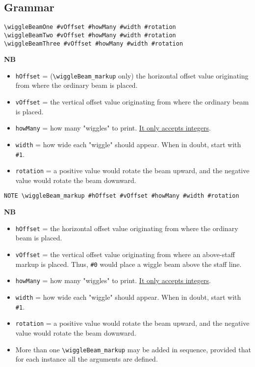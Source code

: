 \documentclass[11pt, oneside]{book}   	%
\begin{document}
\subsection{Grammar}
\begin{verbatim}
\wiggleBeamOne #vOffset #howMany #width #rotation 
\wiggleBeamTwo #vOffset #howMany #width #rotation 
\wiggleBeamThree #vOffset #howMany #width #rotation 
\end{verbatim}
\textbf{NB} 
\begin{itemize}
\item \verb|hOffset| = (\verb|\wiggleBeam_markup| only) the horizontal offset value originating from where the ordinary beam is placed. 
\item \verb|vOffset| = the vertical offset value originating from where the ordinary beam is placed. 
\item \verb|howMany| = how many "wiggles" to print. \underline{It only accepts integers}.
\item \verb|width| = how wide each "wiggle" should appear. When in doubt, start with \verb|#1|. 
\item \verb|rotation| = a positive value would rotate the beam upward, and the negative value would rotate the beam downward.
\end{itemize}
\hrulefill
\begin{verbatim}
NOTE \wiggleBeam_markup #hOffset #vOffset #howMany #width #rotation 
\end{verbatim}
\textbf{NB} 
\begin{itemize}
\item \verb|hOffset| = the horizontal offset value originating from where the ordinary beam is placed. 
\item \verb|vOffset| = the vertical offset value originating from where an above-staff markup is placed. Thus, \verb|#0| would place a wiggle beam above the staff line. 
\item \verb|howMany| = how many "wiggles" to print. \underline{It only accepts integers}.
\item \verb|width| = how wide each "wiggle" should appear. When in doubt, start with \verb|#1|. 
\item \verb|rotation| = a positive value would rotate the beam upward, and the negative value would rotate the beam downward.
\item More than one \verb|\wiggleBeam_markup| may be added in sequence, provided that for each instance all the arguments are defined.
\end{itemize}
\end{document}
